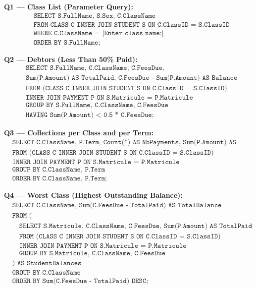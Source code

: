 \documentclass[11pt]{article}
\begin{document}
\begin{experience}
\textbf{Q1 — Class List (Parameter Query):}
\begin{align*}
&\texttt{SELECT S.FullName, S.Sex, C.ClassName}\\
&\texttt{FROM CLASS C INNER JOIN STUDENT S ON C.ClassID = S.ClassID}\\
&\texttt{WHERE C.ClassName = [Enter class name:]}\\
&\texttt{ORDER BY S.FullName;}
\end{align*}

\textbf{Q2 — Debtors (Less Than 50\% Paid):}
\begin{align*}
&\texttt{SELECT S.FullName, C.ClassName, C.FeesDue,}\\
&\texttt{Sum(P.Amount) AS TotalPaid, C.FeesDue - Sum(P.Amount) AS Balance}\\
&\texttt{FROM (CLASS C INNER JOIN STUDENT S ON C.ClassID = S.ClassID)}\\
&\texttt{INNER JOIN PAYMENT P ON S.Matricule = P.Matricule}\\
&\texttt{GROUP BY S.FullName, C.ClassName, C.FeesDue}\\
&\texttt{HAVING Sum(P.Amount) < 0.5 * C.FeesDue;}
\end{align*}

\textbf{Q3 — Collections per Class and per Term:}
\begin{align*}
&\texttt{SELECT C.ClassName, P.Term, Count(*) AS NbPayments, Sum(P.Amount) AS Collected}\\
&\texttt{FROM (CLASS C INNER JOIN STUDENT S ON C.ClassID = S.ClassID)}\\
&\texttt{INNER JOIN PAYMENT P ON S.Matricule = P.Matricule}\\
&\texttt{GROUP BY C.ClassName, P.Term}\\
&\texttt{ORDER BY C.ClassName, P.Term;}
\end{align*}

\textbf{Q4 — Worst Class (Highest Outstanding Balance):}
\begin{align*}
&\texttt{SELECT C.ClassName, Sum(C.FeesDue - TotalPaid) AS TotalBalance}\\
&\texttt{FROM (}\\
&\quad\texttt{SELECT S.Matricule, C.ClassName, C.FeesDue, Sum(P.Amount) AS TotalPaid}\\
&\quad\texttt{FROM (CLASS C INNER JOIN STUDENT S ON C.ClassID = S.ClassID)}\\
&\quad\texttt{INNER JOIN PAYMENT P ON S.Matricule = P.Matricule}\\
&\quad\texttt{GROUP BY S.Matricule, C.ClassName, C.FeesDue}\\
&\texttt{) AS StudentBalances}\\
&\texttt{GROUP BY C.ClassName}\\
&\texttt{ORDER BY Sum(C.FeesDue - TotalPaid) DESC;}
\end{align*}
\end{experience}
\end{document}
